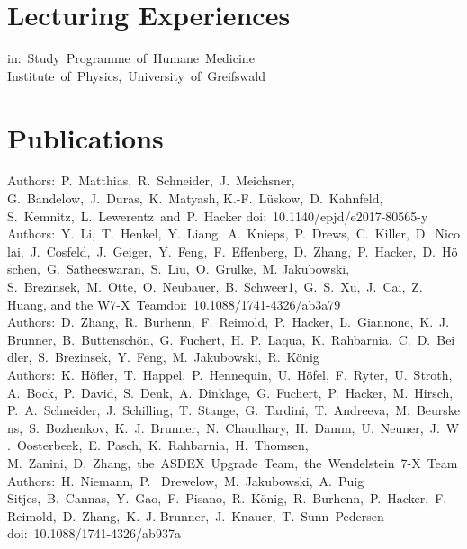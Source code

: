 \documentclass[11pt,a4paper]{moderncv}
\begin{document}
\section{Lecturing Experiences}
%
{in:~Study~Programme~of~Humane~Medicine\newline}{}%
{Institute~of~Physics,~University~of~Greifswald}{}


\section{Publications}
%
{Authors:~P.~Matthias,~R.~Schneider,~J.~Meichsner,~%
    G.~Bandelow,~J.~Duras,~K.~Matyash, K.-F.~Lüskow,~D.~Kahnfeld,~%
    S.~Kemnitz,~L.~Lewerentz~and~P.~Hacker}{%
    doi:~10.1140/epjd/e2017-80565-y}{}{}
%
{Authors:~Y.~Li,~T.~Henkel,~Y.~Liang,~A.~Knieps,~P.~Drews,~C.~Killer,~D.~Nicolai,~J.~Cosfeld,~J.~Geiger,~Y.~Feng,~F.~Effenberg,~D.~Zhang,~P.~Hacker,~D.~Höschen,~G.~Satheeswaran,~S.~Liu,~O.~Grulke,~M. Jakubowski, S.~Brezinsek,~M.~Otte,~O.~Neubauer,~B.~Schweer1,~G.~S.~Xu,~J.~Cai,~Z. Huang, and the W7-X~Team}{doi:~10.1088/1741-4326/ab3a79}{}{}
%
{Authors:~D.~Zhang,~R.~Burhenn,~F.~Reimold,~P.~Hacker,~L.~Giannone,~K.~J.~Brunner,~B.~Buttenschön,~G.~Fuchert,~H.~P.~Laqua,~K.~Rahbarnia,~C.~D.~Beidler,~S.~Brezinsek,~Y.~Feng,~M.~Jakubowski,~R.~König}{}{}{}
%
{Authors:~K.~Höfler,~T.~Happel,~P.~Hennequin,~U.~Höfel,~F.~Ryter,~U.~Stroth,~A.~Bock,~P.~David,~S.~Denk,~A.~Dinklage,~G.~Fuchert,~P.~Hacker,~M.~Hirsch,~P.~A.~Schneider,~J.~Schilling,~T.~Stange,~G.~Tardini,~T.~Andreeva,~M.~Beurskens,~S.~Bozhenkov,~K.~J.~Brunner,~N.~Chaudhary,~H.~Damm,~U.~Neuner,~J.~W.~Oosterbeek,~E.~Pasch,~K.~Rahbarnia,~H.~Thomsen, M.~Zanini,~D.~Zhang,~the~ASDEX~Upgrade~Team,~the~Wendelstein~7-X~Team}{}{}{}
%
{Authors:~H.~Niemann,~P.~ Drewelow,~M.~Jakubowski,~A.~Puig Sitjes,~B.~Cannas,~Y.~Gao,~F.~Pisano,~R.~König,~R.~Burhenn,~P.~Hacker,~F.~Reimold,~D.~Zhang,~K.~J. Brunner,~J.~Knauer,~T.~Sunn~Pedersen}{%
    doi:~10.1088/1741-4326/ab937a}{}{}
\end{document}
